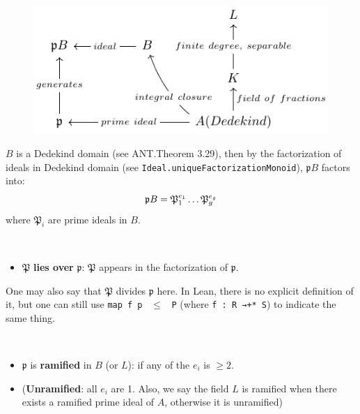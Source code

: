 \begin{figure}[!htpb]
\centering
\includegraphics[width=0.7\linewidth]{Figures/figure2.pdf}
\end{figure}
\noindent
$B$ is a Dedekind domain (see ANT.Theorem 3.29), then by the factorization of ideals in Dedekind domain (see \verb|Ideal.uniqueFactorizationMonoid|), $\mathfrak{p}B$ factors into:
\begin{equation}
    \notag
    \mathfrak{p}B=\mathfrak{P}_1^{e_1} \dots \mathfrak{P}_g^{e_g}
\end{equation}
where $\mathfrak{P}_i$ are prime ideals in $B$.
\begin{defi}
    ~\begin{itemize}
        \item $\mathfrak{P}$ \textbf{lies over} $\mathfrak{p}$: $\mathfrak{P}$ appears in the factorization of $\mathfrak{p}$.
    \end{itemize}
\end{defi}
\begin{rmk}
    One may also say that $\mathfrak{P}$ divides $\mathfrak{p}$ here. In Lean, there is no explicit definition of it, but one can still use \verb|map f p| \ $\leq$ \ \verb|P| (where \verb|f : R →+* S|) to indicate the same thing.
\end{rmk}
\begin{defi}[Ramified]
    ~\begin{itemize}
        \item $\mathfrak{p}$ is \textbf{ramified} in $B$ (or $L$): if any of the $e_i$ is $\geq 2$.
        \item (\textbf{Unramified}: all $e_i$ are 1. Also, we say the field $L$ is ramified when there exists a ramified prime ideal of $A$, otherwise it is unramified)
    \end{itemize}
\end{defi}
